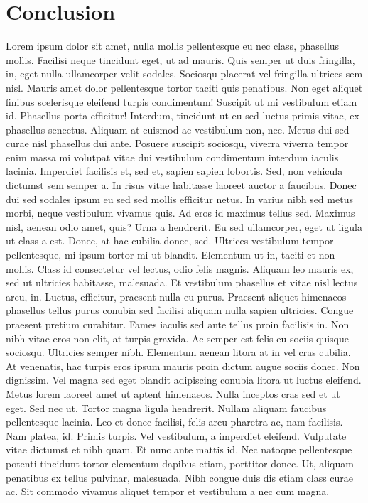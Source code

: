 \documentclass[
  12pt,
]{article}
\begin{document}
\hypertarget{conclusion}{%
\section{Conclusion}\label{conclusion}}

Lorem ipsum dolor sit amet, nulla mollis pellentesque eu nec class, phasellus mollis. Facilisi neque tincidunt eget, ut ad mauris. Quis semper ut duis fringilla, in, eget nulla ullamcorper velit sodales. Sociosqu placerat vel fringilla ultrices sem nisl. Mauris amet dolor pellentesque tortor taciti quis penatibus. Non eget aliquet finibus scelerisque eleifend turpis condimentum! Suscipit ut mi vestibulum etiam id. Phasellus porta efficitur! Interdum, tincidunt ut eu sed luctus primis vitae, ex phasellus senectus. Aliquam at euismod ac vestibulum non, nec. Metus dui sed curae nisl phasellus dui ante. Posuere suscipit sociosqu, viverra viverra tempor enim massa mi volutpat vitae dui vestibulum condimentum interdum iaculis lacinia. Imperdiet facilisis et, sed et, sapien sapien lobortis. Sed, non vehicula dictumst sem semper a. In risus vitae habitasse laoreet auctor a faucibus. Donec dui sed sodales ipsum eu sed sed mollis efficitur netus. In varius nibh sed metus morbi, neque vestibulum vivamus quis. Ad eros id maximus tellus sed. Maximus nisl, aenean odio amet, quis? Urna a hendrerit. Eu sed ullamcorper, eget ut ligula ut class a est. Donec, at hac cubilia donec, sed. Ultrices vestibulum tempor pellentesque, mi ipsum tortor mi ut blandit. Elementum ut in, taciti et non mollis. Class id consectetur vel lectus, odio felis magnis. Aliquam leo mauris ex, sed ut ultricies habitasse, malesuada. Et vestibulum phasellus et vitae nisl lectus arcu, in. Luctus, efficitur, praesent nulla eu purus. Praesent aliquet himenaeos phasellus tellus purus conubia sed facilisi aliquam nulla sapien ultricies. Congue praesent pretium curabitur. Fames iaculis sed ante tellus proin facilisis in. Non nibh vitae eros non elit, at turpis gravida. Ac semper est felis eu sociis quisque sociosqu. Ultricies semper nibh. Elementum aenean litora at in vel cras cubilia. At venenatis, hac turpis eros ipsum mauris proin dictum augue sociis donec. Non dignissim. Vel magna sed eget blandit adipiscing conubia litora ut luctus eleifend. Metus lorem laoreet amet ut aptent himenaeos. Nulla inceptos cras sed et ut eget. Sed nec ut. Tortor magna ligula hendrerit. Nullam aliquam faucibus pellentesque lacinia. Leo et donec facilisi, felis arcu pharetra ac, nam facilisis. Nam platea, id. Primis turpis. Vel vestibulum, a imperdiet eleifend. Vulputate vitae dictumst et nibh quam. Et nunc ante mattis id. Nec natoque pellentesque potenti tincidunt tortor elementum dapibus etiam, porttitor donec. Ut, aliquam penatibus ex tellus pulvinar, malesuada. Nibh congue duis dis etiam class curae ac. Sit commodo vivamus aliquet tempor et vestibulum a nec cum magna.
\end{document}
